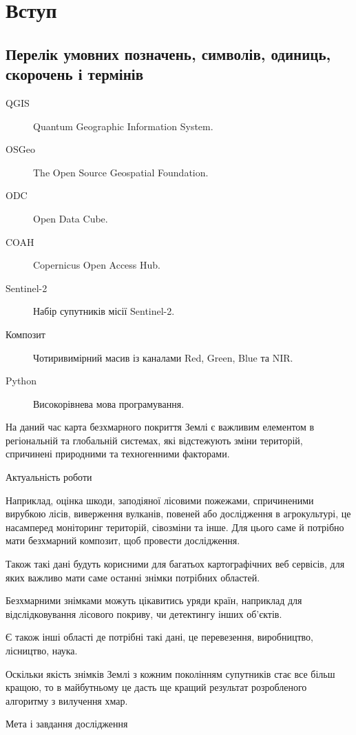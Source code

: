 \chapter{Вступ}\section*{Перелік умовних позначень, символів, одиниць, скорочень і термінів}\begin{description}\item[QGIS] Quantum Geographic Information System.\item[OSGeo] The Open Source Geospatial Foundation.\item[ODC] Open Data Cube.\item[COAH] Copernicus Open Access Hub.\item[Sentinel-2] Набір супутників місії Sentinel-2.\item[Композит] Чотиривимірний масив із каналами Red, Green, Blue та NIR.\item[Python] Високорівнева мова програмування.\end{description}На даний час карта безхмарного покриття Землі є важливим елементом в регіональній та глобальній системах, які відстежують зміни територій, спричинені природними та техногенними факторами.

Актуальність роботи

Наприклад, оцінка шкоди, заподіяної лісовими пожежами, спричиненими вирубкою лісів, виверження вулканів, повеней або дослідження в агрокультурі, це насамперед моніторинг територій, сівозміни та інше. Для цього саме й потрібно мати безхмарний композит, щоб провести дослідження.

Також такі дані будуть корисними для багатьох картографічних веб сервісів, для яких важливо мати саме останні знімки потрібних областей.

Безхмарними знімками можуть цікавитись уряди країн, наприклад для відслідковування лісового покриву, чи детектингу інших об’єктів.

Є також інші області де потрібні такі дані, це перевезення, виробництво, лісництво, наука.

Оскільки якість знімків Землі з кожним поколінням супутників стає все більш кращою, то в майбутньому це дасть ще кращий результат розробленого алгоритму з вилучення хмар.

Мета і завдання дослідження

